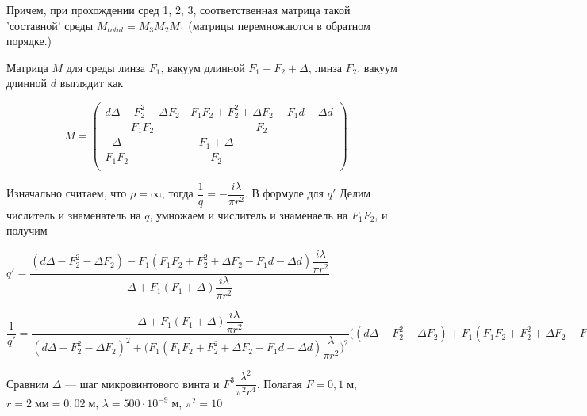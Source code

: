Причем, при прохождении сред 1, 2, 3, соответственная матрица такой 'составной' среды $M_{total} = M_{3} M_{2} M_{1}$ (матрицы перемножаются в обратном порядке.)


Матрица $M$ для среды линза $F_{1}$, вакуум длинной $F_{1} + F_{2} + \Delta$, линза $F_{2}$, вакуум длинной $d$ выглядит как

\begin{equation*}
M =
\begin{pmatrix}
 \dfrac{d\Delta - F_{2}^2 - \Delta F_{2}}{F_{1}F_{2}} & \dfrac{F_{1}F_{2} + F_{2}^2 + \Delta F_{2} - F_{1}d- \Delta d}{F_{2}} \\
\dfrac{\Delta}{F_{1} F_{2}} & - \dfrac{F_{1} + \Delta}{F_{2}} \\
\end{pmatrix}
\end{equation*}

Изначально считаем, что $\rho = \infty$, тогда $ \dfrac{1}{q} = - \dfrac{i \lambda}{\pi r^2}$. В формуле для $q'$ Делим числитель и знаменатель на $q$, умножаем и числитель и знаменаель на $F_{1} F_{2}$, и получим

$q' = \dfrac{(d\Delta - F_{2}^2 - \Delta F_{2}) - F_{1}(F_{1}F_{2} + F_{2}^2 + \Delta F_{2} - F_{1}d- \Delta d)\dfrac{i \lambda}{\pi r^2}}{\Delta + F_{1}(F_{1} + \Delta) \dfrac{i \lambda}{\pi r^2}} $

$\dfrac{1}{q'}
=
\dfrac{\Delta + F_{1}(F_{1} + \Delta)\dfrac{i \lambda}{\pi r^2}}{(d\Delta - F_{2}^2 -\Delta F_{2})^2 + \Big(F_{1}(F_{1}F_{2} + F_{2}^2 + \Delta F_{2} - F_{1}d- \Delta d)\dfrac{ \lambda}{\pi r^2}\Big)^2} \Big((d\Delta - F_{2}^2 - \Delta F_{2}) + F_{1}(F_{1}F_{2} + F_{2}^2 + \Delta F_{2} - F_{1}d- \Delta d)\dfrac{i \lambda}{\pi r^2}\Big) 
\approx
\dfrac{\Delta + F_{1}(F_{1} + \Delta)\dfrac{i \lambda}{\pi r^2}}{(d\Delta - F_{2}^2 -\Delta F_{2})^2} \Big((d\Delta - F_{2}^2 - \Delta F_{2}) + F_{1}(F_{1}F_{2} + F_{2}^2 + \Delta F_{2} - F_{1}d- \Delta d)\dfrac{i \lambda}{\pi r^2}\Big)
=
\dfrac{1}{(d\Delta - F_{2}^2 -\Delta F_{2})^2}\Big((d\Delta - F_{2}^2 - \Delta F_{2}) + F_{1}(F_{1}F_{2} + F_{2}^2 + \Delta F_{2} - F_{1}d- \Delta d)\dfrac{i \lambda}{\pi r^2}\Big)\Big(\Delta + F_{1}(F_{1} + \Delta)\dfrac{i \lambda}{\pi r^2}\Big) \approx$ 




Сравним $\Delta$ --- шаг микровинтового винта и $F^3 \dfrac{ \lambda^2}{\pi^2 r^4}$. Полагая $F = 0,1 \;м$, $r = 2 \; мм = 0,02 \; м$, $\lambda = 500 \cdot 10^{-9} \; м$, $\pi^2 = 10$



